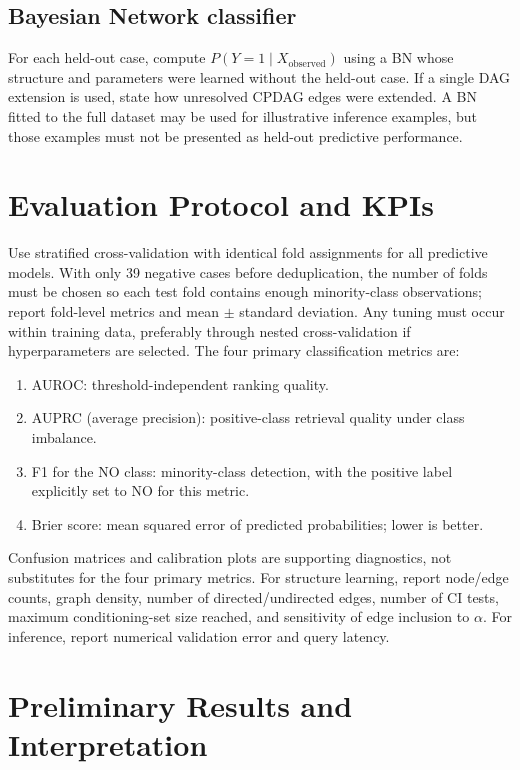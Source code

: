\documentclass[10pt,twocolumn,letterpaper]{article}
\begin{document}
	\subsection{Bayesian Network classifier}
	For each held-out case, compute \(P(Y = 1 \mid X_{\text{observed}})\) using a BN whose structure and parameters were learned without the held-out case. If a single DAG extension is used, state how unresolved CPDAG edges were extended. A BN fitted to the full dataset may be used for illustrative inference examples, but those examples must not be presented as held-out predictive performance.

	\section{Evaluation Protocol and KPIs}
	Use stratified cross-validation with identical fold assignments for all predictive models. With only 39 negative cases before deduplication, the number of folds must be chosen so each test fold contains enough minority-class observations; report fold-level metrics and mean \(\pm\) standard deviation. Any tuning must occur within training data, preferably through nested cross-validation if hyperparameters are selected. The four primary classification metrics are:
	\begin{enumerate}
		\item AUROC: threshold-independent ranking quality.
		\item AUPRC (average precision): positive-class retrieval quality under class imbalance.
		\item F1 for the NO class: minority-class detection, with the positive label explicitly set to NO for this metric.
		\item Brier score: mean squared error of predicted probabilities; lower is better.
	\end{enumerate}

	Confusion matrices and calibration plots are supporting diagnostics, not substitutes for the four primary metrics. For structure learning, report node/edge counts, graph density, number of directed/undirected edges, number of CI tests, maximum conditioning-set size reached, and sensitivity of edge inclusion to \(\alpha\). For inference, report numerical validation error and query latency.

	\section{Preliminary Results and Interpretation}\label{sec:results}
\end{document}
